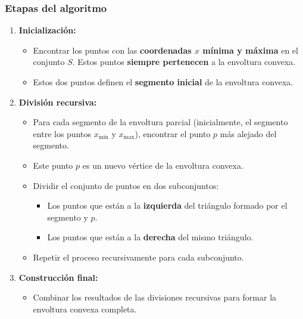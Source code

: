 \documentclass[12pt]{book}
\theoremstyle{definition}
\theoremstyle{plain}
\theoremstyle{remark}
\begin{document}
\subsubsection{Etapas del algoritmo}

\begin{enumerate}
    \item \textbf{Inicialización:}
    \begin{itemize}
        \item Encontrar los puntos con las \textbf{coordenadas \( x \) mínima y máxima} en el conjunto \( S \). Estos puntos \textbf{siempre pertenecen} a la envoltura convexa.
        \item Estos dos puntos definen el \textbf{segmento inicial} de la envoltura convexa.
    \end{itemize}

    \item \textbf{División recursiva:}
    \begin{itemize}
        \item Para cada segmento de la envoltura parcial (inicialmente, el segmento entre los puntos \( x_{\min} \) y \( x_{\max} \)), encontrar el punto \( p \) más alejado del segmento.
        \item Este punto \( p \) es un nuevo vértice de la envoltura convexa.
        \item Dividir el conjunto de puntos en dos subconjuntos:
        \begin{itemize}
            \item Los puntos que están a la \textbf{izquierda} del triángulo formado por el segmento y \( p \).
            \item Los puntos que están a la \textbf{derecha} del mismo triángulo.
        \end{itemize}
        \item Repetir el proceso recursivamente para cada subconjunto.
    \end{itemize}

    \item \textbf{Construcción final:}
    \begin{itemize}
        \item Combinar los resultados de las divisiones recursivas para formar la envoltura convexa completa.
    \end{itemize}
\end{enumerate}
\end{document}

